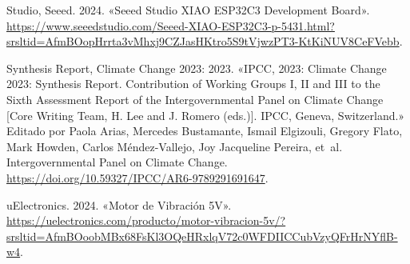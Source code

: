 \documentclass[
  letterpaper,
  DIV=11,
  numbers=noendperiod]{scrreport}
\newlength{\cslhangindent}
\newenvironment{CSLReferences}[2] %
 {\begin{list}{}{%
  \setlength{\itemindent}{0pt}
  \setlength{\leftmargin}{0pt}
  \setlength{\parsep}{0pt}
  \ifodd #1
   \setlength{\leftmargin}{\cslhangindent}
   \setlength{\itemindent}{-1\cslhangindent}
  \fi
  \setlength{\itemsep}{#2\baselineskip}}}
 {\end{list}}
\begin{document}
\begin{CSLReferences}{1}{0}
Studio, Seeed. 2024. {«Seeed Studio XIAO ESP32C3 Development Board»}.
\url{https://www.seeedstudio.com/Seeed-XIAO-ESP32C3-p-5431.html?srsltid=AfmBOopHrrta3vMhxj9CZJasHKtro5S9tVjwzPT3-KtKiNUV8CeFVebb}.

Synthesis Report, Climate Change 2023: 2023. {«IPCC, 2023: Climate
Change 2023: Synthesis Report. Contribution of Working Groups I, II and
III to the Sixth Assessment Report of the Intergovernmental Panel on
Climate Change {[}Core Writing Team, H. Lee and J. Romero (eds.){]}.
IPCC, Geneva, Switzerland.»} Editado por Paola Arias, Mercedes
Bustamante, Ismail Elgizouli, Gregory Flato, Mark Howden, Carlos
Méndez-Vallejo, Joy Jacqueline Pereira, et~al. Intergovernmental Panel
on Climate Change.
\url{https://doi.org/10.59327/IPCC/AR6-9789291691647}.

uElectronics. 2024. {«Motor de Vibración 5V»}.
\url{https://uelectronics.com/producto/motor-vibracion-5v/?srsltid=AfmBOoobMBx68FsKl3OQeHRxlqV72c0WFDIICCubVzyQFrHrNYflB-w4}.

\end{CSLReferences}
\end{document}
